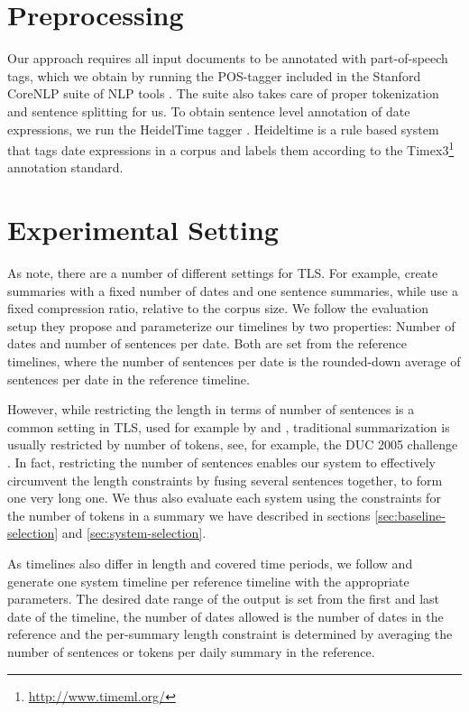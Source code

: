 \documentclass[a4paper,BCOR=10mm]{report}
\numberwithin{lemma}{chapter}
\numberwithin{definition}{chapter}
\begin{document}
\section{Preprocessing}

Our approach requires all input documents to be annotated with part-of-speech tags, which we obtain by running the POS-tagger included in the Stanford CoreNLP suite of NLP tools \citep{stanford-corenlp}. The suite also takes care of proper tokenization and sentence splitting for us.
To obtain sentence level annotation of date expressions, we run the HeidelTime tagger \citet{heideltime}. Heideltime is a rule based system that tags date expressions in a corpus and labels them according to the Timex3\footnote{\url{http://www.timeml.org/}} annotation standard.

\section{Experimental Setting} \label{sec:setup-settings}

As \citet{markert} note, there are a number of different settings for TLS.
For example, \citet{chieu} create summaries with a fixed number of dates and one sentence summaries, while \citet{yan-trans} use a fixed compression ratio, relative to the corpus size.
We follow the evaluation setup they propose and parameterize our timelines by two properties: Number of dates and number of sentences per date. Both are set from the reference timelines, where the number of sentences per date is the rounded-down average of sentences per date in the reference timeline.

However, while restricting the length in terms of number of sentences is a common setting in TLS, used for example by \citet{chieu} and \citet{yan-trans}, traditional summarization is usually restricted by number of tokens, see, for example, the DUC 2005 challenge \citep{duc2005}. In fact, restricting the number of sentences enables our system to effectively circumvent the length constraints by fusing several sentences together, to form one very long one.
We thus also evaluate each system using the constraints for the number of tokens in a summary we have described in sections \ref{sec:baseline-selection} and \ref{sec:system-selection}.

As timelines also differ in length and covered time periods, we follow \citet{markert} and generate one system timeline per reference timeline with the appropriate parameters. The desired date range of the output is set from the first and last date of the timeline, the number of dates allowed is the number of dates in the reference and the per-summary length constraint is determined by averaging the number of sentences or tokens per daily summary in the reference.
\end{document}
